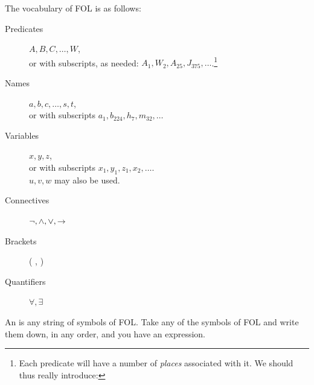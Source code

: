 \begin{definition}
	The vocabulary of FOL is as follows: 
\begin{description}
\item[Predicates] $A,B,C,\ldots,W$,\\ or with subscripts, as needed: $A_1, W_2,A_{25},J_{375},\ldots$.\footnote{Each predicate will have a number of \emph{places} associated with it. We should thus really introduce:}
\item[Names] $a,b,c,\ldots, s, t$, \\
or with subscripts $a_1, b_{224}, h_7, m_{32},\ldots$
\item[Variables] $x,y,z$, \\
or with subscripts $x_1, y_1, z_1, x_2,\ldots$. \\
$u,v,w$ may also be used.
\item[Connectives]  $\neg,\mathbin{\wedge},\vee,\rightarrow$
\item[Brackets] ( , )
\item[Quantifiers]  $\forall, \exists$
\end{description}
\end{definition}
\begin{definition}
	An  is any string of symbols of FOL. Take any of the symbols of FOL and write them down, in any order, and you have an expression.
\end{definition}


